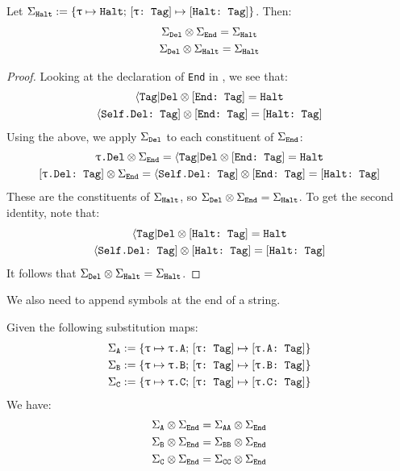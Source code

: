 \documentclass[../generics]{subfiles}
\begin{document}
\begin{lemma}\label{tag halt lemma}
Let $\Sigma_{\texttt{Halt}} := \{\texttt{$\uptau$} \mapsto \texttt{Halt};\,[\texttt{$\uptau$:~Tag}] \mapsto [\texttt{Halt:~Tag}]\}$. Then:
\begin{gather*}
\Sigma_{\texttt{Del}}\otimes\Sigma_{\texttt{End}}=\Sigma_{\texttt{Halt}}\\
\Sigma_{\texttt{Del}}\otimes\Sigma_{\texttt{Halt}}=\Sigma_{\texttt{Halt}}
\end{gather*}
\end{lemma}
\begin{proof}
Looking at the declaration of \texttt{End} in , we see that:
\begin{gather*}
\langle\texttt{Tag}|\texttt{Del}\otimes[\texttt{End:~Tag}]=\texttt{Halt}\\
\langle\texttt{Self.Del:~Tag}]\otimes[\texttt{End:~Tag}]=[\texttt{Halt:~Tag}]
\end{gather*}
Using the above, we apply $\Sigma_{\texttt{Del}}$ to each constituent of $\Sigma_{\texttt{End}}$:
\begin{gather*}
\texttt{$\uptau$.Del} \otimes \SigmaEnd = \AssocTypeDel \otimes \ConfEndTag = \Halt\\
\ConfReq{$\uptau$.Del}{Tag} \otimes \SigmaEnd = \AssocConfDelTag \otimes \ConfEndTag = \ConfHaltTag
\end{gather*}
These are the constituents of $\Sigma_{\texttt{Halt}}$, so $\Sigma_{\texttt{Del}}\otimes\Sigma_{\texttt{End}}=\Sigma_{\texttt{Halt}}$. To get the second identity, note that:
\begin{gather*}
\langle\texttt{Tag}|\texttt{Del}\otimes[\texttt{Halt:~Tag}]=\texttt{Halt}\\
\langle\texttt{Self.Del:~Tag}]\otimes[\texttt{Halt:~Tag}]=[\texttt{Halt:~Tag}]
\end{gather*}
It follows that $\Sigma_{\texttt{Del}}\otimes\Sigma_{\texttt{Halt}}=\Sigma_{\texttt{Halt}}$.
\end{proof}

We also need to append symbols at the end of a string.

\begin{lemma}\label{tag end lemma}
Given the following substitution maps:
\begin{gather*}
\Sigma_{\texttt{A}} := \{\texttt{$\uptau$} \mapsto \texttt{$\uptau$.A};\,[\texttt{$\uptau$:~Tag}] \mapsto [\texttt{$\uptau$.A:~Tag}]\}\\
\Sigma_{\texttt{B}} := \{\texttt{$\uptau$} \mapsto \texttt{$\uptau$.B};\,[\texttt{$\uptau$:~Tag}] \mapsto [\texttt{$\uptau$.B:~Tag}]\}\\
\Sigma_{\texttt{C}} := \{\texttt{$\uptau$} \mapsto \texttt{$\uptau$.C};\,[\texttt{$\uptau$:~Tag}] \mapsto [\texttt{$\uptau$.C:~Tag}]\}
\end{gather*}
We have:
\begin{gather*}
\Sigma_{\texttt{A}}\otimes\Sigma_{\texttt{End}}=\Sigma_{\texttt{AA}}\otimes\Sigma_{\texttt{End}}\\
\Sigma_{\texttt{B}}\otimes\Sigma_{\texttt{End}}=\Sigma_{\texttt{BB}}\otimes\Sigma_{\texttt{End}}\\
\Sigma_{\texttt{C}}\otimes\Sigma_{\texttt{End}}=\Sigma_{\texttt{CC}}\otimes\Sigma_{\texttt{End}}
\end{gather*}
\end{lemma}
\end{document}
